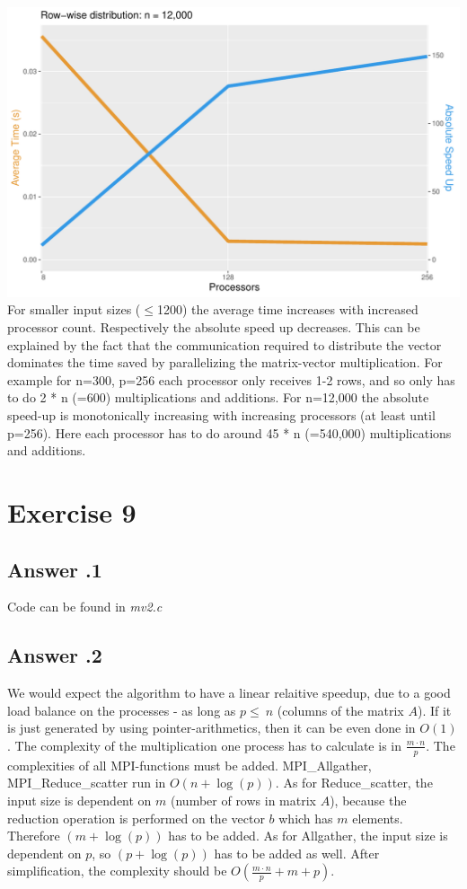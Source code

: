 \documentclass[a4paper,%
11pt,%
DIV=12,
headsepline,%
headings=normal,
]{scrartcl}
\newcounter{curex}
\newcommand{\exercise}[1]{\section*{Exercise #1}\setcounter{curex}{#1}}
\newcommand{\answer}[1]{\subsection*{Answer \arabic{curex}.#1}}
\begin{document}
\includegraphics[scale=0.4,page=1]{../plots/matrix_vector_plot_Row-wise-distribution_12000} \\

For smaller input sizes ($\leq$1200) the average time increases with increased processor count. Respectively the absolute speed up decreases. This can be explained by the fact that the communication required to distribute the vector dominates the time saved by parallelizing the matrix-vector multiplication. For example for n=300, p=256 each processor only receives 1-2 rows, and so only has to do 2 * n (=600) multiplications and additions. For n=12,000 the absolute speed-up is monotonically increasing with increasing processors (at least until p=256). Here each processor has to do around 45 * n (=540,000) multiplications and additions.

\exercise{9}

\answer{1}
Code can be found in \textit{mv2.c}
\answer{2}
We would expect the algorithm to have a linear relaitive speedup, due to a good load balance on the processes - as long as $p \leq\ n$  (columns of the matrix $A$). 
If it is just generated by using pointer-arithmetics, then  it can be even done in $O\left(1\right)$. The complexity of the multiplication one process has to calculate is in $\frac{m \cdot n}{p}$. The complexities of all MPI-functions must be added. MPI\_Allgather,  MPI\_Reduce\_scatter run in $O(n + \log(p))$. As for Reduce\_scatter, the input size is dependent on $m$ (number of rows in matrix $A$), because the reduction operation is performed on the vector $b$ which has $m$ elements. Therefore $(m + \log(p))$ has to be added. As for Allgather, the input size is dependent on $p$, so $(p + \log(p))$ has to be added as well. After simplification, the complexity should be $O\left(\frac{m \cdot n}{p} + m + p\right)$.\\
\end{document}
